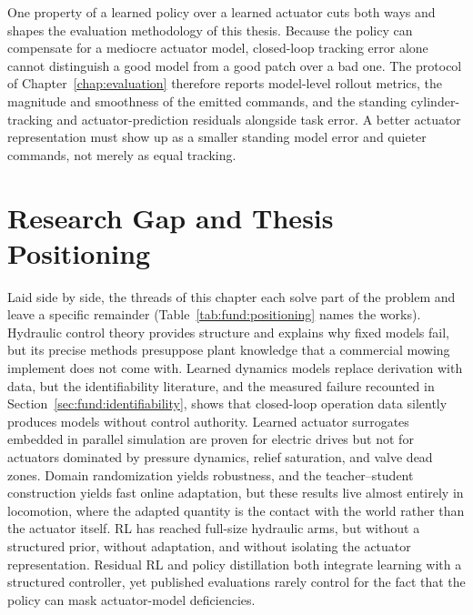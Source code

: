 One property of a learned policy over a learned actuator cuts both ways
and shapes the evaluation methodology of this thesis. Because the policy
can compensate for a mediocre actuator model, closed-loop tracking error
alone cannot distinguish a good model from a good patch over a bad one.
The protocol of Chapter~\ref{chap:evaluation} therefore reports
model-level rollout metrics, the magnitude and smoothness of the emitted
commands, and the standing cylinder-tracking and actuator-prediction
residuals alongside task error. A better actuator representation must show up as a smaller standing model error and
quieter commands, not merely as equal tracking.

\section{Research Gap and Thesis Positioning}
\label{sec:fund:gap}

Laid side by side, the threads of this chapter each solve part of the
problem and leave a specific remainder
(Table~\ref{tab:fund:positioning} names the works). Hydraulic control
theory provides structure and explains why fixed models fail, but its
precise methods presuppose plant knowledge that a commercial mowing
implement does not come with. Learned dynamics models replace
derivation with data, but the identifiability literature, and the
measured failure recounted in Section~\ref{sec:fund:identifiability},
shows that closed-loop operation data silently produces models without
control authority. Learned actuator surrogates embedded in parallel
simulation are proven for electric drives but not for actuators
dominated by pressure dynamics, relief saturation, and valve dead
zones. Domain randomization yields robustness, and the teacher--student
construction yields fast online adaptation, but these results live
almost entirely in locomotion, where the adapted quantity is the
contact with the world rather than the actuator itself. RL has reached
full-size hydraulic arms, but without a structured prior, without
adaptation, and without isolating the actuator representation.
Residual RL and policy distillation both integrate learning with a
structured controller, yet published evaluations rarely control for the
fact that the policy can mask actuator-model deficiencies.

